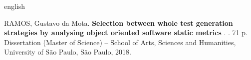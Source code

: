 \documentclass[
	12pt,				%
	oneside,			%
	a4paper,			%
	english,			%
	brazil				%
	]{abntex2ppgsi}
\begin{document}
% 
% 
\begin{resumo}[Abstract]
\begin{otherlanguage*}{english}

% 
%
%
%
\begin{flushleft}
RAMOS, Gustavo da Mota. \textbf{Selection between whole test generation strategies by analysing object oriented software  static metrics }.  \imprimirdata. 71 p. Dissertation (Master of Science) – School of Arts, Sciences and Humanities, University of São Paulo, São Paulo, 2018. 
\end{flushleft}


\end{otherlanguage*}
\end{resumo}
\end{document}
